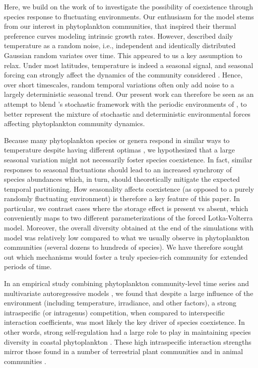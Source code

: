 \documentclass[a4paper,12pt]{article}
\begin{document}
Here, we build on the work of \citet{scranton_coexistence_2016} to
investigate the possibility of coexistence through species response
to fluctuating environments. Our enthusiasm for the \citet{scranton_coexistence_2016}
model stems from our interest in phytoplankton communities, that inspired
their thermal preference curves modeling intrinsic growth rates. However,
\citet{scranton_coexistence_2016} described daily temperature as
a random noise, i.e., independent and identically distributed Gaussian
random variates over time. This appeared to us a key assumption to
relax. Under most latitudes, temperature is indeed a seasonal signal,
and seasonal forcing can strongly affect the dynamics of the community
considered \citep{vesipa_impact_2017}. Hence, over short timescales,
random temporal variations often only add noise to a largely deterministic
seasonal trend. Our present work can therefore be seen as an attempt
to blend \citet{scranton_coexistence_2016}'s stochastic framework
with the periodic environments of \citet{barabas_community_2012},
to better represent the mixture of stochastic and deterministic environmental
forces affecting phytoplankton community dynamics. 

Because many phytoplankton species or genera respond in similar ways
to temperature despite having different optimas \citep{moisan_modelling_2002},
we hypothesized that a large seasonal variation might not necessarily
foster species coexistence. In fact, similar responses to seasonal
fluctuations should lead to an increased synchrony of species abundances
which, in turn, should theoretically mitigate the expected temporal
partitioning. How seasonality affects coexistence (as opposed to a
purely randomly fluctuating environment) is therefore a key feature
of this paper. In particular, we contrast cases where the storage
effect is present vs absent, which conveniently maps to two different
parameterizations of the forced Lotka-Volterra model. Moreover, the
overall diversity obtained at the end of the simulations with \citet{scranton_coexistence_2016}
model was relatively low compared to what we usually observe in phytoplankton
communities (several dozens to hundreds of species). We have therefore
sought out which mechanisms would foster a truly species-rich community
for extended periods of time. 

In an empirical study combining phytoplankton community-level time
series and multivariate autoregressive models \citep{barraquand2018coastal},
we found that despite a large influence of the environment (including
temperature, irradiance, and other factors), a strong intraspecific
(or intragenus) competition, when compared to interspecific interaction
coefficients, was most likely the key driver of species coexistence.
In other words, strong self-regulation had a large role to play in
maintaining species diversity in coastal phytoplankton \citep{barraquand2018coastal}.
These high intraspecific interaction strengths mirror those found
in a number of terrestrial plant communities \citep{adler_competition_2018}
and in animal communities \citep{mutshinda_what_2009}.
\end{document}
